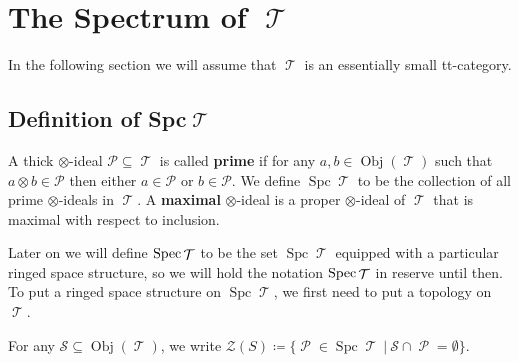 \documentclass[11pt]{article}
\DeclareMathOperator{\ob}{Obj}
\DeclareMathOperator{\TT}{\mathcal{T}}
\DeclareMathOperator{\cP}{\mathcal{P}}
\DeclareMathOperator{\spc}{Spc}
\begin{document}
\newpage

\section{The Spectrum of \texorpdfstring{$\TT$}{𝓣}}

In the following section we will assume that $\TT$ is an essentially small tt-category.

\subsection{Definition of Spc\texorpdfstring{$\TT$}{𝓣}}

\begin{defn}
A thick $\otimes$-ideal $\mathcal{P} \subseteq \TT$ is called \textbf{prime} if for any $a,b \in \ob(\TT)$ such that $a \otimes b \in \mathcal{P}$ then either $a \in \mathcal{P}$ or $b \in \mathcal{P}$. We define $\spc \TT$ to be the collection of all prime $\otimes$-ideals in $\TT$. A \textbf{maximal} $\otimes$-ideal is a proper $\otimes$-ideal of $\TT$ that is maximal with respect to inclusion.
\end{defn}

Later on we will define $\Spec \TT $ to be the set $\spc \TT$ equipped with a particular ringed space structure, so we will hold the notation $\Spec \TT$ in reserve until then. To put a ringed space structure on $\spc \TT$, we first need to put a topology on $\TT$.

\begin{defn}
For any $\mathcal{S} \subseteq \ob(\TT)$, we write $\mathcal{Z}(S) \coloneqq \{\cP \in \spc \TT\:|\:\mathcal{S}\cap \cP = \emptyset\}$.
\end{defn}
\end{document}
